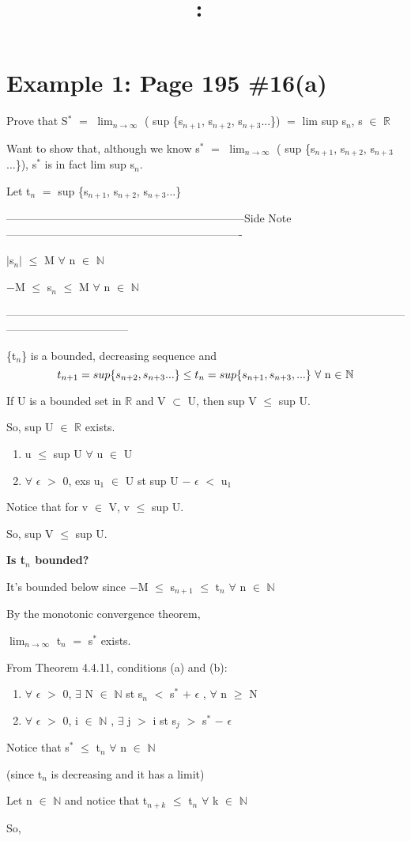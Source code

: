 \documentclass{article}
\title{
    \vspace{2in}
    \textmd{\textbf{\hmwkClass:\ \hmwkTitle}}\\
    \normalsize\vspace{0.1in}\small\vspace{0.1in}\large{\textit{\hmwkClassInstructor}}
    \vspace{3in}
}
\author{\hmwkAuthorName}
\date{}
\newcommand{\mt}[1]{\ensuremath{#1}}
\newcommand\bsc[2][\DefaultOpt]{%
  \def\DefaultOpt{#2}%
  \section[#1]{#2}%
}
\newcommand{\balist}{\begin{enumerate}[label=\alph*.]}
\newcommand{\elist}{\end{enumerate}}
\newcommand{\bilist}{\begin{enumerate}[label=\roman*)]}
\newcommand{\sidenote}[1]{-----------------------------------------------------------------Side Note----------------------------------------------------------------
#1 \

---------------------------------------------------------------------------------------------------------------------------------------------}
\newcommand{\br}{\mt{\mathbb{R}} }       %
\newcommand{\bn}{\mt{\mathbb{N}} }       %
\newcommand{\ep}{\mt{\epsilon} }         %
\newcommand{\fa}{\mt{\forall} }          %
\newcommand{\mem}{\mt{\in} }
\newcommand{\exs}{\mt{\exists} }
\newcommand{\sbs}{\mt{\subset} }         %
\newcommand{\av}[1]{\mt{|}#1\mt{|}}  %
\newcommand{\bk}[1]{\{#1\}}
\newcommand{\ps}{\mt{+} }
\newcommand{\ms}{\mt{-} }
\newcommand{\ls}{\mt{<} }
\newcommand{\gr}{\mt{>} }
\newcommand{\lse}{\mt{\leq} }
\newcommand{\gre}{\mt{\geq} }
\newcommand{\eql}{\mt{=} }
\newcommand{\uw}[2]{#1\mt{_{#2}}}
\newcommand{\uf}[2]{#1\mt{^{#2}}}
\newcommand{\lmti}[1]{\mt{\displaystyle{\lim_{#1 \to \infty}}}}
\newcommand{\eqn}[1]{\[#1\]}
\begin{document}
\bsc{Example 1: Page 195 \#16(a)}{

Prove that \uf{S}{*} \eql \lmti{n} ( sup \bk{\uw{s}{n + 1}, \uw{s}{n + 2}, \uw{s}{n + 3}...}) \eql lim sup \uw{s}{n}, s \mem \br

Want to show that, although we know \uf{s}{*} \eql \lmti{n} ( sup \bk{\uw{s}{n + 1}, \uw{s}{n + 2}, \uw{s}{n + 3}...}), \uf{s}{*} is in fact lim sup \uw{s}{n}.

Let \uw{t}{n} \eql sup \bk{\uw{s}{n + 1}, \uw{s}{n + 2}, \uw{s}{n + 3}...}

\sidenote{
\av{\uw{s}{n}} \lse M \fa n \mem \bn

$-$M \lse \uw{s}{n} \lse M \fa n \mem \bn
}

\bk{\uw{t}{n}} is a bounded, decreasing sequence and
\eqn{t_{n + 1} = sup \bk{s_{n + 2}, s_{n + 3}...} \lse t_n = sup \bk{\uw{s}{n + 1}, \uw{s}{n + 3}, ...} \textrm{ \fa n \mem } \bn}

If U is a bounded set in \br and V \sbs U, then sup V \lse sup U.

So, sup U \mem \br exists.

\bilist
\item u \lse sup U \fa u \mem U
\item \fa \ep \gr 0, exs \uw{u}{1} \mem U st sup U \ms \ep \ls \uw{u}{1}
\elist

Notice that for v \mem V, v \lse sup U.

So, sup V \lse sup U.

\textbf{Is \uw{t}{n} bounded?}

It's bounded below since $-$M \lse \uw{s}{n + 1} \lse \uw{t}{n} \fa n \mem \bn

By the monotonic convergence theorem,

\lmti{n} \uw{t}{n} \eql \uf{s}{*} exists.

From Theorem 4.4.11, conditions (a) and (b):

\balist
\item \fa \ep \gr 0, \exs N \mem \bn st \uw{s}{n} \ls \uf{s}{*} \ps \ep, \fa n \gre N
\item \fa \ep \gr 0, i \mem \bn, \exs j \gr i st \uw{s}{j} \gr \uf{s}{*} \ms \ep
\elist

Notice that \uf{s}{*} \lse \uw{t}{n} \fa n \mem \bn

(since \uw{t}{n} is decreasing and it has a limit)

Let n \mem \bn and notice that \uw{t}{n + k} \lse \uw{t}{n} \fa k \mem \bn

So, 

}
\end{document}
